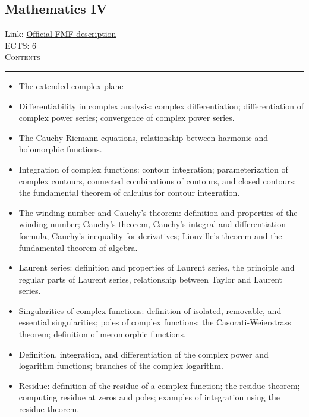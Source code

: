 \documentclass[11pt, a4paper]{article}
\newenvironment{course}[3]{
\subsection{#1}%
Link: \href{#2}{Official FMF description}\\%
ECTS: #3%
\vspace{1ex}
\\
{\large \textsc{Contents}}\\[-0.9ex]%
\rule{\textwidth}{0.5pt}
\vspace{-3ex}
}
{}
\newenvironment{chapter}[1]{
\begin{tcolorbox}[title=#1, breakable]
}
{\end{tcolorbox}}
\begin{document}
\begin{course}{Mathematics IV}{https://www.fmf.uni-lj.si/en/study-physics/programmes/1fiz/2020/7000777/courses/523/}{6}
    \label{mathematics_4}

    \begin{chapter}{Complex analysis}
        \begin{itemize}
        
            \item The extended complex plane

            \item Differentiability in complex analysis: complex differentiation; differentiation of complex power series; convergence of complex power series.

            \item The Cauchy-Riemann equations, relationship between harmonic and holomorphic functions.

            \item Integration of complex functions: contour integration; parameterization of complex contours, connected combinations of contours, and closed contours; the fundamental theorem of calculus for contour integration.

            \item The winding number and Cauchy's theorem: definition and properties of the winding number; Cauchy's theorem, Cauchy's integral and differentiation formula, Cauchy's inequality for derivatives; Liouville's theorem and the fundamental theorem of algebra.

            \item Laurent series: definition and properties of Laurent series, the principle and regular parts of Laurent series, relationship between Taylor and Laurent series.

            \item Singularities of complex functions: definition of isolated, removable, and essential singularities; poles of complex functions; the Casorati-Weierstrass theorem; definition of meromorphic functions.

            \item Definition, integration, and differentiation of the complex power and logarithm functions; branches of the complex logarithm.

            \item Residue: definition of the residue of a complex function; the residue theorem; computing residue at zeros and poles; examples of integration using the residue theorem.


\end{itemize}
\end{chapter}
\end{course}
\end{document}
